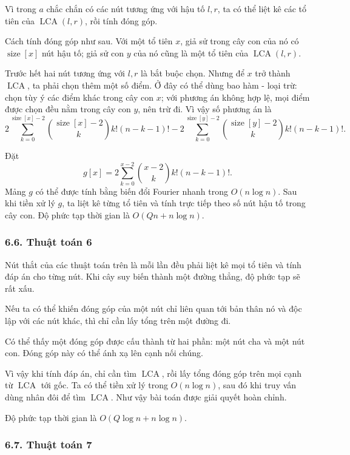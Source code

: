 \documentclass[11pt]{article}
\begin{document}
Vì trong \(a\) chắc chắn có các nút tương ứng với hậu tố \(l,r\), ta có thể
liệt kê các tổ tiên của \(\operatorname{LCA}(l,r)\), rồi tính đóng góp.

Cách tính đóng góp như sau. Với một tổ tiên \(x\), giả sử trong cây con của
nó có \(\operatorname{size}[x]\) nút hậu tố; giả sử con \(y\) của nó cũng là
một tổ tiên của \(\operatorname{LCA}(l,r)\).

Trước hết hai nút tương ứng với \(l,r\) là bắt buộc chọn. Nhưng để \(x\) trở
thành \(\operatorname{LCA}\), ta phải chọn thêm một số điểm. Ở đây có thể dùng
bao hàm - loại trừ: chọn tùy ý các điểm khác trong cây con \(x\); với phương
án không hợp lệ, mọi điểm được chọn đều nằm trong cây con \(y\), nên trừ đi.
Vì vậy số phương án là
\[
  2\sum_{k=0}^{\operatorname{size}[x]-2}
  \binom{\operatorname{size}[x]-2}{k}k!(n-k-1)!
  -
  2\sum_{k=0}^{\operatorname{size}[y]-2}
  \binom{\operatorname{size}[y]-2}{k}k!(n-k-1)!.
\]

Đặt
\[
  g[x]=2\sum_{k=0}^{x-2}\binom{x-2}{k}k!(n-k-1)!.
\]
Mảng \(g\) có thể được tính bằng biến đổi Fourier nhanh trong
\(O(n\log n)\). Sau khi tiền xử lý \(g\), ta liệt kê từng tổ tiên và tính trực
tiếp theo số nút hậu tố trong cây con. Độ phức tạp thời gian là
\(O(Qn+n\log n)\).

\subsubsection*{6.6. Thuật toán 6}

Nút thắt của các thuật toán trên là mỗi lần đều phải liệt kê mọi tổ tiên và
tính đáp án cho từng nút. Khi cây suy biến thành một đường thẳng, độ phức tạp
sẽ rất xấu.

Nếu ta có thể khiến đóng góp của một nút chỉ liên quan tới bản thân nó và độc
lập với các nút khác, thì chỉ cần lấy tổng trên một đường đi.

Có thể thấy một đóng góp được cấu thành từ hai phần: một nút cha và một nút
con. Đóng góp này có thể ánh xạ lên cạnh nối chúng.

Vì vậy khi tính đáp án, chỉ cần tìm \(\operatorname{LCA}\), rồi lấy tổng đóng
góp trên mọi cạnh từ \(\operatorname{LCA}\) tới gốc. Ta có thể tiền xử lý trong
\(O(n\log n)\), sau đó khi truy vấn dùng nhân đôi để tìm \(\operatorname{LCA}\).
Như vậy bài toán được giải quyết hoàn chỉnh.

Độ phức tạp thời gian là \(O(Q\log n+n\log n)\).

\subsubsection*{6.7. Thuật toán 7}
\end{document}
